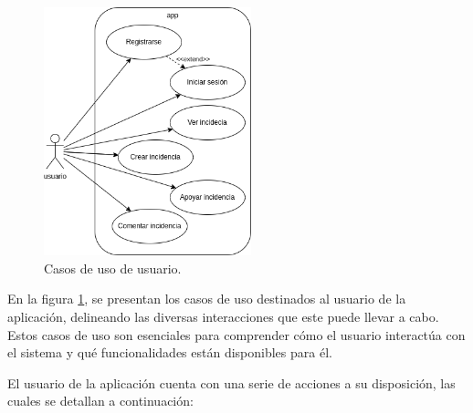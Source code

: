 \documentclass{article}
\begin{document}
\begin{figure}[H]
    \center
    \includegraphics[width=6cm]{images/caso_de_uso_usuario.png}
    \caption{Casos de uso de usuario.}
    \label{fig:caso_uso_usuario}
\end{figure}


En la figura \ref{fig:caso_uso_usuario}, se presentan los casos de uso destinados al usuario de la aplicación, delineando las diversas interacciones que este puede llevar a cabo. Estos casos de uso son esenciales para comprender cómo el usuario interactúa con el sistema y qué funcionalidades están disponibles para él.

El usuario de la aplicación cuenta con una serie de acciones a su disposición, las cuales se detallan a continuación:
\end{document}
